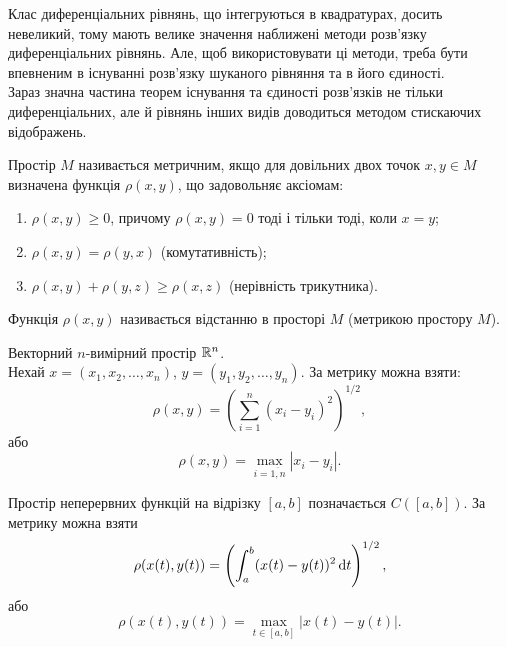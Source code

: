 Клас диференціальних рівнянь, що інтегруються в квадратурах, досить невеликий, тому мають велике значення наближені методи розв’язку диференціальних рівнянь. Але, щоб використовувати ці методи, треба бути впевненим в існуванні розв’язку шуканого рівняння та в його єдиності. \\

Зараз значна частина теорем існування  та єдиності розв’язків не тільки диференціальних, але й рівнянь інших видів доводиться методом стискаючих відображень. \\

\begin{definition} 
	Простір $M$ називається метричним, якщо для довільних двох точок $x,y\in M$ визначена функція $\rho(x,y)$, що задовольняє аксіомам:
	\begin{enumerate}
		\item $\rho(x, y)\ge0$, причому $\rho(x,y)=0$ тоді і тільки тоді, коли $x=y$;
		\item $\rho(x,y)=\rho(y,x)$ (комутативність);
		\item $\rho(x,y)+\rho(y,z)\ge\rho(x,z)$ (нерівність трикутника).
	\end{enumerate}
	Функція $\rho(x,y)$ називається відстанню в просторі $M$ (метрикою простору $M$).
\end{definition}
\begin{example} 
	Векторний $n$-вимірний простір $\mathbb{R}^n$. \\

	Нехай $x=(x_1,x_2,\ldots,x_n)$, $y=(y_1,y_2,\ldots,y_n)$. За метрику можна взяти: 
	\begin{equation*}
		\rho(x,y)=\left(\sum_{i=1}^n (x_i-y_i)^2\right)^{1/2},
	\end{equation*}
	або 
	\begin{equation*}
		\rho(x,y)=\max_{i=\overline{1,n}}|x_i-y_i|.
	\end{equation*}
\end{example}
\begin{example} 
	Простір неперервних функцій на відрізку $[a,b]$ позначається $C([a,b])$. За метрику можна взяти 
	\begin{equation*}
		\rho(x(t), y(t)) = \left(\int_a^b (x(t)-y(t))^2 \mathop{}\!\mathrm{d} t\right)^{1/2},
	\end{equation*}
	або
	\begin{equation*}
		\rho(x(t), y(t)) = \max_{t\in[a,b]} |x(t)-y(t)|.
	\end{equation*}
\end{example}
